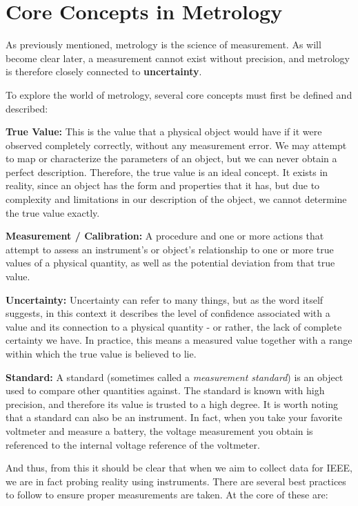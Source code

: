 \section{Core Concepts in Metrology}

As previously mentioned, metrology is the science of measurement. As will become clear later, a measurement cannot exist without precision, and metrology is therefore closely connected to \textbf{uncertainty}.

To explore the world of metrology, several core concepts must first be defined and described:

\textbf{True Value:}  
This is the value that a physical object would have if it were observed completely correctly, without any measurement error. We may attempt to map or characterize the parameters of an object, but we can never obtain a perfect description. Therefore, the true value is an ideal concept. It exists in reality, since an object has the form and properties that it has, but due to complexity and limitations in our description of the object, we cannot determine the true value exactly.

\textbf{Measurement / Calibration:}  
A procedure and one or more actions that attempt to assess an instrument’s or object’s relationship to one or more true values of a physical quantity, as well as the potential deviation from that true value.

\textbf{Uncertainty:}  
Uncertainty can refer to many things, but as the word itself suggests, in this context it describes the level of confidence associated with a value and its connection to a physical quantity - or rather, the lack of complete certainty we have. In practice, this means a measured value together with a range within which the true value is believed to lie.

\textbf{Standard:}  
A standard (sometimes called a \textit{measurement standard}) is an object used to compare other quantities against. The standard is known with high precision, and therefore its value is trusted to a high degree. It is worth noting that a standard can also be an instrument. In fact, when you take your favorite voltmeter and measure a battery, the voltage measurement you obtain is referenced to the internal voltage reference of the voltmeter.

And thus, from this it should be clear that when we aim to collect data for IEEE, we are in fact probing reality using instruments. There are several best practices to follow to ensure proper measurements are taken. At the core of these are:

